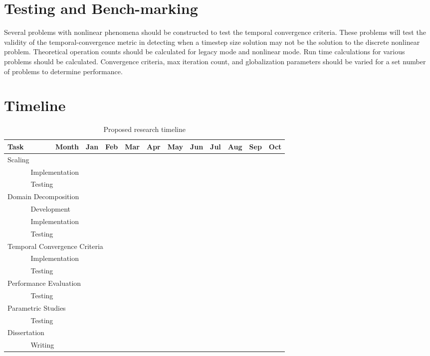 \section{Testing and Bench-marking}
\label{sect:proposal_temporal_testing}
Several problems with nonlinear phenomena should be constructed to test the temporal convergence criteria.
These problems will test the validity of the temporal-convergence metric in detecting when a timestep size solution may not be the solution to the discrete nonlinear problem.
Theoretical operation counts should be calculated for legacy mode and nonlinear mode.
Run time calculations for various problems should be calculated.
Convergence criteria, max iteration count, and globalization parameters should be varied for a set number of problems to determine performance.

\section{Timeline}
\label{sect:proposal_time_line}

\newcommand{\cc}{\cellcolor{black}}
\begin{table}[ht]
\singlespace
\centering
\begin{tabular}{@{}l l c c c c  c c c c c c @{}} \toprule
Task & \multicolumn{1}{r}{Month} & Jan & Feb & Mar & Apr & May & Jun & Jul & Aug & Sep & Oct\\
\midrule
\multicolumn{12}{l}{Scaling}  \\
& Implementation & \cc & \cc &     &     &     &     &     &     &     &     \\
& Testing        &     & \cc & \cc &     &     &     &     &     &     &     \\
\multicolumn{12}{l}{Domain Decomposition} \\
& Development    & \cc & \cc &     &     &     &     &     &     &     &     \\
& Implementation &     & \cc & \cc & \cc & \cc &     &     &     &     &     \\
& Testing        &     &     &     &     & \cc & \cc &     &     &     &     \\
\multicolumn{12}{l}{Temporal Convergence Criteria}\\
& Implementation & \cc & \cc &     &     &     &     &     &     &     &     \\
& Testing        &     &     & \cc & \cc &     &     &     &     &     &     \\
\multicolumn{12}{l}{Performance Evaluation} \\
& Testing        &     &     &     &     &     & \cc & \cc &     &     &     \\
\multicolumn{12}{l}{Parametric Studies} \\
& Testing        &     &     &     &     &     & \cc & \cc & \cc &     &     \\
\multicolumn{12}{l}{Dissertation} \\
& Writing        & \cc & \cc & \cc & \cc & \cc & \cc & \cc & \cc & \cc & \cc \\
\bottomrule  
\end{tabular}
\caption{Proposed research timeline}
\label{tab:time_line}
\end{table}

